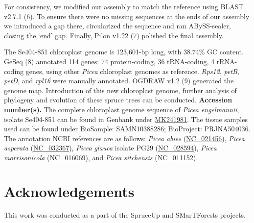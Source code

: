 \documentclass[titlepage,11pt, oneside]{article}   	%
\begin{document}
For consistency, we modified our assembly to match the reference using BLAST v2.7.1 (6).  To ensure there were no missing sequences at the ends of our assembly we introduced a gap there, circularized the sequence and ran ABySS-sealer, closing the ‘end’ gap. Finally, Pilon v1.22 (7) polished the final assembly.
\newline
\par
The Se404-851 chloroplast genome is 123,601-bp long, with 38.74\% GC content. GeSeq (8) annotated 114 genes: 74 protein-coding, 36 tRNA-coding, 4 rRNA-coding genes, using other \textit{Picea} chloroplast genomes as reference. \textit{Rps12}, \textit{petB}, \textit{petD}, and \textit{rpl16} were manually annotated. OGDRAW v1.2 (9) generated the genome map. Introduction of this new chloroplast genome, further analysis of phylogeny and evolution of these spruce trees can be conducted.
\newline
\newline
\textbf{Accession number(s).} The complete chloroplast genome sequence of \textit{Picea engelmannii}, isolate Se404-851 can be found in Genbank under \href{https://www.ncbi.nlm.nih.gov/nuccore/MK241981}{MK241981}. The tissue samples used can be found under BioSample: SAMN10388286; BioProject: PRJNA504036. The annotation NCBI references are as follows: \textit{Picea abies} (\href{https://www.ncbi.nlm.nih.gov/nuccore/NC_021456}{NC\_021456}), \textit{Picea asperata} (\href{https://www.ncbi.nlm.nih.gov/nuccore/NC_032367}{NC\_032367}), \textit{Picea glauca} isolate PG29 (\href{https://www.ncbi.nlm.nih.gov/nuccore/NC_028594}{NC\_028594}), \textit{Picea morrisonicola} (\href{https://www.ncbi.nlm.nih.gov/nuccore/NC_016069}{NC\_016069}), and \textit{Picea sitchensis} (\href{https://www.ncbi.nlm.nih.gov/nuccore/NC_011152}{NC\_011152}).

\section*{Acknowledgements}
This work was conducted as a part of the SpruceUp and SMarTForests projects.
\end{document}
